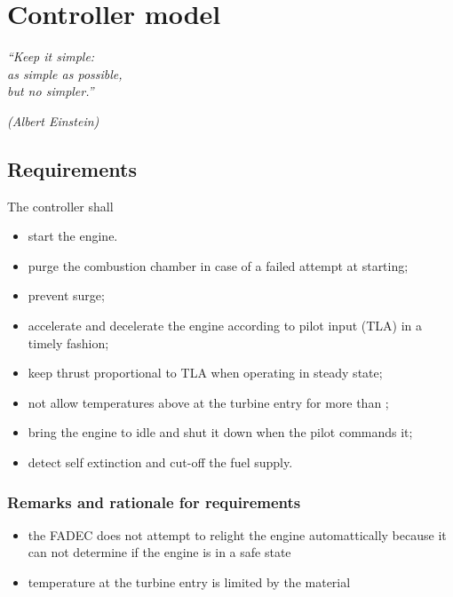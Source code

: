 \documentclass[tcc]{subfiles}
\begin{document}
\chapter{Controller model}
\label{ch:control}
\epigraph{\em ``Keep it simple:\\
as simple as possible,\\
but no simpler.''}{\em (Albert Einstein)}

\section{Requirements}
The controller shall
\begin{itemize}
    \item start the engine.
    \item purge the combustion chamber in case of a failed attempt at starting;
    \item prevent surge;
    \item accelerate and decelerate the engine according to pilot input (\acs{TLA}) in a timely fashion;
    \item keep thrust proportional to \gls{TLA} when operating in steady state;
    \item not allow temperatures above  at the turbine entry for more than ;
    \item bring the engine to idle and shut it down when the pilot commands it;
    \item detect self extinction and cut-off the fuel supply.
\end{itemize}

\subsection{Remarks and rationale for requirements}
\begin{itemize}
    \item the \gls{FADEC} does not attempt to relight the engine automattically 
          because it can not determine if the engine is in a safe state
    \item temperature at the turbine entry is limited by the material 
\end{itemize}
\end{document}
